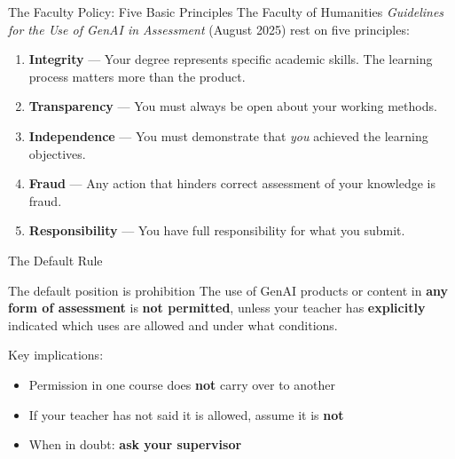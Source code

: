 \documentclass[aspectratio=169,11pt]{beamer}
\begin{document}
\begin{frame}{The Faculty Policy: Five Basic Principles}
    The Faculty of Humanities \textit{Guidelines for the Use of GenAI in Assessment} (August 2025) rest on five principles:
    \vspace{0.3cm}
    \begin{enumerate}
        \item \textbf{Integrity} --- Your degree represents specific academic skills. The learning process matters more than the product.
        \item \textbf{Transparency} --- You must always be open about your working methods.
        \item \textbf{Independence} --- You must demonstrate that \textit{you} achieved the learning objectives.
        \item \textbf{Fraud} --- Any action that hinders correct assessment of your knowledge is fraud.
        \item \textbf{Responsibility} --- You have full responsibility for what you submit.
    \end{enumerate}
\end{frame}

\begin{frame}{The Default Rule}
    \begin{alertblock}{The default position is prohibition}
        The use of GenAI products or content in \textbf{any form of assessment} is \textbf{not permitted}, unless your teacher has \textbf{explicitly} indicated which uses are allowed and under what conditions.
    \end{alertblock}
    \vspace{0.5cm}
    Key implications:
    \begin{itemize}
        \item Permission in one course does \textbf{not} carry over to another
        \item If your teacher has not said it is allowed, assume it is \textbf{not}
        \item When in doubt: \textbf{ask your supervisor}
    \end{itemize}
\end{frame}
\end{document}
